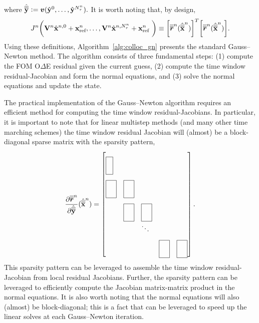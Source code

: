 where $\hat{\overline{\overline{\mathbf{y}}}}^{} \vcentcolon= \boldsymbol v (\hat{\mathbf{y}}^{0},\ldots,\hat{\mathbf{y}}^{N_{\tau}^{n}} ).$
It is worth noting that, by design,
\begin{equation*}
J_{}^{n} \bigg( \mathbf {V}^{n} \hat{\mathbf{x}}^{n,0} + \mathbf{x}_\text{ref}^{n},\ldots,\mathbf {V}^{n} \hat{\mathbf{x}}^{n,N_{\tau}^{n}} + \mathbf{x}_\text{ref}^{n} \ \bigg) 
\equiv
\bigg[\overline{\overline{\boldsymbol r}}^{n}_{\text{}}  (\hat{\overline{\overline{\mathbf {x}}}}^{n}) \bigg]^T \bigg[ \overline{\overline{\boldsymbol r}}^{n}_{\text{}}(\hat{\overline{\overline{\mathbf {x}}}}^{n}) \bigg].
\end{equation*} 
Using these definitions, Algorithm~\ref{alg:colloc_gn} presents the standard Gauss--Newton method. The algorithm consists of three fundamental steps: (1) compute the FOM O$\Delta$E residual given the current guess, (2) compute the time window residual-Jacobian and form the normal equations, and (3) solve the normal equations and update the state. 

The practical implementation of the Gauss--Newton algorithm requires an efficient method for computing the time window residual-Jacobians. In particular, it is important to note that for linear multistep methods (and many other time marching schemes) the time window residual Jacobian will (almost) be a block-diagonal 
sparse matrix with the sparsity pattern,
\begin{equation*}
\frac{\partial \residLMSSlabArg{n}}{\partial \genstatecollocMatySlabArg{}}(\genstatecollocMatSlabArg{n})  =
 \begin{bmatrix*}[l]
\matshapeb & \\%
 \matshapea & \matshapea & \\%
 & \matshapea  & \matshapea & \\%
&  & \ddots & \\%
 & &  & \matshapea &  \matshapea 
\end{bmatrix*}.
\end{equation*}
This sparsity pattern can be leveraged to assemble the time window residual-Jacobian from local residual Jacobians. 
Further, the sparsity pattern can be 
leveraged to efficiently compute the Jacobian matrix-matrix product in the normal equations.
It is also worth noting that the 
normal equations will also (almost) be block-diagonal; this is a fact that can be leveraged to speed up the linear solves at each Gauss--Newton iteration.

